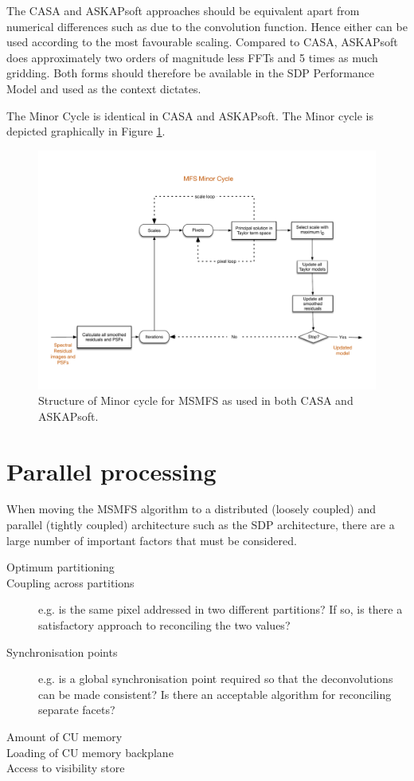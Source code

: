 \documentclass[11pt,a4paper]{article}
\begin{document}
The CASA and ASKAPsoft approaches should be equivalent apart from numerical differences such as due to the convolution function. Hence either can be used according to the most favourable scaling. Compared to CASA, ASKAPsoft does approximately two orders of magnitude less FFTs and 5 times as much gridding. Both forms should therefore be available in the SDP Performance Model and used as the context dictates.

The Minor Cycle is identical in CASA and ASKAPsoft. The Minor cycle is depicted graphically in Figure \ref{fig:minor}.

\begin{figure}[htb]
  \centering
  \includegraphics[width=\textwidth]{./MSMFS_Minor.pdf}
  \caption{Structure of Minor cycle for MSMFS as used in both CASA and ASKAPsoft.}
  \label{fig:minor}
\end{figure}


\clearpage
\section{Parallel processing}
\label{sec:parallel}

When moving the MSMFS algorithm to a distributed (loosely coupled) and parallel (tightly coupled) architecture such as the SDP architecture, there are a large number of important factors that must be considered.
\begin{description}
\item[Optimum partitioning] 
\item[Coupling across partitions] e.g. is the same pixel addressed in two different partitions? If so, is there a satisfactory approach to reconciling the two values?
\item[Synchronisation points] e.g. is a global synchronisation point required so that the deconvolutions can be made consistent? Is there an acceptable algorithm for reconciling separate facets?
\item[Amount of CU memory]
\item[Loading of CU memory backplane]
\item[Access to visibility store]
\end{description}
\end{document}
